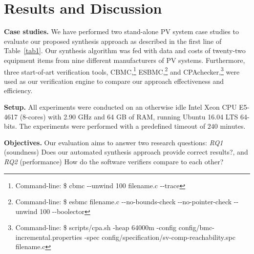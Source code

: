 \documentclass[review]{elsarticle}
\begin{document}
\section{Results and Discussion}
\textbf{Case studies.} We have performed two stand-alone PV system case studies to evaluate our proposed synthesis approach as described in the first line of Table~\ref{tab1}. Our synthesis algorithm was fed with data and costs of twenty-two equipment items from nine different manufacturers of PV systems. Furthermore, three start-of-art verification tools, CBMC,\footnote{Command-line: \$ cbmc -\phantom{}-unwind 100 filename.c -\phantom{}-trace} ESBMC,\footnote{Command-line: \$ esbmc filename.c -\phantom{}-no-bounds-check -\phantom{}-no-pointer-check -\phantom{}-unwind 100 -\phantom{}-boolector} %
and CPAchecker,\footnote{Command-line: \$ scripts/cpa.sh -heap 64000m -config config/bmc-incremental.properties -spec config/specification/sv-comp-reachability.spc filename.c} were used as our verification engine to compare our approach effectiveness and efficiency. 

\textbf{Setup.} All experiments were conducted on an otherwise idle Intel Xeon CPU E5-4617 (8-cores) with 2.90 GHz and 64 GB of RAM, running Ubuntu 16.04 LTS 64-bits. 
The experiments were performed with a predefined timeout of $240$ minutes.

\textbf{Objectives.} Our evaluation aims to answer two research questions: \textit{RQ1} (soundness) Does our automated synthesis approach provide correct results?, and \textit{RQ2} (performance) How do the software verifiers compare to each other?
\end{document}
